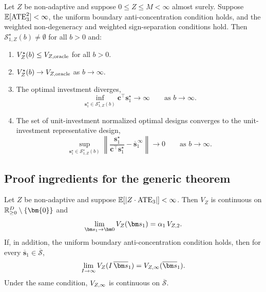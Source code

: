 \begin{theorem}
  \label{thm:large-budget-weighted-target-impact-appendix}
  Let $Z$ be non-adaptive and suppose $0\le Z\le M<\infty$ almost surely.
  Suppose $\mathbb{E}[\mathrm{ATE}_3^2]<\infty$, the uniform boundary anti-concentration condition  holds, and the weighted non-degeneracy and weighted sign-separation conditions  hold.
  Then $\mathcal S_{1,Z}^\star(b)\neq\emptyset$ for all $b>0$ and:
  \begin{enumerate}
    \item[\rm (i)] $V_Z^\star(b)\le V_{Z,\mathrm{oracle}}$ for all $b>0$.
    \item[\rm (ii)] $V_Z^\star(b)\to V_{Z,\mathrm{oracle}}$ as $b\to\infty$.
    \item[\rm (iii)] The optimal investment diverges,
      \[
        \inf_{\bm s_1^\star\in\mathcal S_{1,Z}^\star(b)} \bm c^\top\bm s_1^\star
        \to\infty
        \qquad\text{as }b\to\infty.
      \]
    \item[\rm (iv)] The set of unit-investment normalized optimal designs converges to the unit-investment representative design,
      \[
        \sup_{\bm s_1^\star\in\mathcal S_{1,Z}^\star(b)}
        \left\|
        \frac{\bm s_1^\star}{\bm c^\top\bm s_1^\star}
        -
        \overline{\bm s}_1^{\,\infty}
        \right\|
        \to0
        \qquad\text{as }b\to\infty.
      \]
  \end{enumerate}
\end{theorem}

\subsection*{Proof ingredients for the generic theorem}

\begin{lemma}
  \label{prop:limiting-impact-values}
  Let $Z$ be non-adaptive and suppose $\mathbb{E}[|Z \cdot \mathrm{ATE}_3|]<\infty$.
  Then $V_Z$ is continuous on $\R_{\geq 0}^{D} \setminus \{\bm{0}\}$ and
  \[
    \lim_{\bm s_1\to\bm0}V_Z(\bm s_1)
    =
    \alpha_1\,V_{Z,\followup}.
  \]
  If, in addition, the uniform boundary anti-concentration condition  holds, then for every $\overline{\bm s}_1\in\overline{\mathcal{S}}$,
  \[
    \lim_{\invst\to\infty}V_Z(\invst\,\overline{\bm s}_1)
    =
    V_{Z,\noisefree}(\overline{\bm s}_1).
  \]
  Under the same condition, $V_{Z,\infty}$ is continuous on $\overline{\mathcal{S}}$.
\end{lemma}

